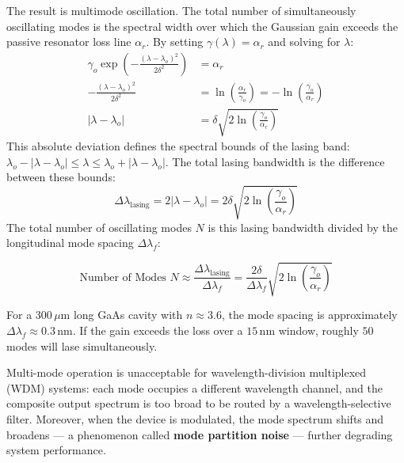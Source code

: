 The result is multimode oscillation. The total number of simultaneously oscillating modes is the spectral width over which the Gaussian gain exceeds the passive resonator loss line $\alpha_r$. By setting $\gamma(\lambda) = \alpha_r$ and solving for $\lambda$:
\begin{align*}
    \gamma_o \exp\!\left(-\frac{(\lambda - \lambda_o)^2}{2\delta^2}\right) & = \alpha_r                                                                                   \\
    -\frac{(\lambda - \lambda_o)^2}{2\delta^2}                             & = \ln\!\left(\frac{\alpha_r}{\gamma_o}\right) = -\ln\!\left(\frac{\gamma_o}{\alpha_r}\right) \\
    |\lambda - \lambda_o|                                                  & = \delta \sqrt{2 \ln\!\left(\frac{\gamma_o}{\alpha_r}\right)}
\end{align*}
This absolute deviation defines the spectral bounds of the lasing band: $\lambda_o - |\lambda - \lambda_o| \le \lambda \le \lambda_o + |\lambda - \lambda_o|$. The total lasing bandwidth is the difference between these bounds:
\begin{equation*}
    \Delta\lambda_\text{lasing} = 2|\lambda - \lambda_o| = 2\delta \sqrt{2 \ln\!\left(\frac{\gamma_o}{\alpha_r}\right)}
\end{equation*}
The total number of oscillating modes $N$ is this lasing bandwidth divided by the longitudinal mode spacing $\Delta\lambda_f$:
\begin{keyresult}
    \begin{equation}
        \text{Number of Modes } N \approx \frac{\Delta\lambda_\text{lasing}}{\Delta\lambda_f} = \frac{2\delta}{\Delta\lambda_f}\sqrt{2 \ln\!\left(\frac{\gamma_o}{\alpha_r}\right)}
    \end{equation}
\end{keyresult}

For a $300\,\mu$m long GaAs cavity with $n \approx 3.6$, the mode spacing is approximately $\Delta\lambda_f \approx 0.3\,\text{nm}$. If the gain exceeds the loss over a $15\,\text{nm}$ window, roughly $50$ modes will lase simultaneously.

Multi-mode operation is unacceptable for wavelength-division multiplexed (WDM) systems: each mode occupies a different wavelength channel, and the composite output spectrum is too broad to be routed by a wavelength-selective filter. Moreover, when the device is modulated, the mode spectrum shifts and broadens — a phenomenon called \textbf{mode partition noise} — further degrading system performance.

